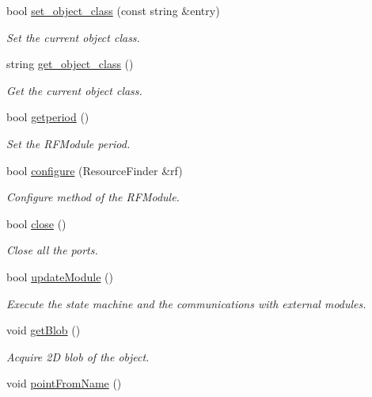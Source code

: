 \begin{DoxyCompactItemize}
bool \hyperlink{classExperimentOne_a4edd34a85b30715ee7d2dda9ea277e91}{set\-\_\-object\-\_\-class} (const string \&entry)
\begin{DoxyCompactList}\small\item\em Set the current object class. \end{DoxyCompactList}\item 
string \hyperlink{classExperimentOne_a43cf934e2479fd6ef87be9048800a489}{get\-\_\-object\-\_\-class} ()
\begin{DoxyCompactList}\small\item\em Get the current object class. \end{DoxyCompactList}\item 
bool \hyperlink{classExperimentOne_af4d06d36f98664027740e2f2587411db}{getperiod} ()
\begin{DoxyCompactList}\small\item\em Set the R\-F\-Module period. \end{DoxyCompactList}\item 
bool \hyperlink{classExperimentOne_acdfcaf1bcef7810b260ee74afd6479bf}{configure} (Resource\-Finder \&rf)
\begin{DoxyCompactList}\small\item\em Configure method of the R\-F\-Module. \end{DoxyCompactList}\item 
bool \hyperlink{classExperimentOne_a6ceff4b470d8800ac941cc813270ff4b}{close} ()
\begin{DoxyCompactList}\small\item\em Close all the ports. \end{DoxyCompactList}\item 
bool \hyperlink{classExperimentOne_a77236f66f20d8f82d06c7aac1314a1bd}{update\-Module} ()
\begin{DoxyCompactList}\small\item\em Execute the state machine and the communications with external modules. \end{DoxyCompactList}\item 
void \hyperlink{classExperimentOne_ad988faee9be73dfabf529d8bf43f421d}{get\-Blob} ()\label{classExperimentOne_ad988faee9be73dfabf529d8bf43f421d}

\begin{DoxyCompactList}\small\item\em Acquire 2\-D blob of the object. \end{DoxyCompactList}\item 
void \hyperlink{classExperimentOne_ac815fad9912cd04f2f512efbb1f67571}{point\-From\-Name} ()\label{classExperimentOne_ac815fad9912cd04f2f512efbb1f67571}


\end{DoxyCompactItemize}
